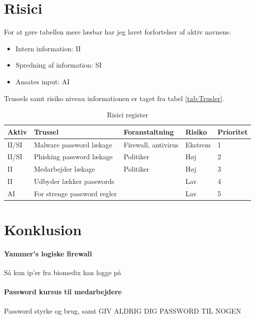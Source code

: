 \documentclass{article}
\begin{document}
\section{Risici}
For at gøre tabellen mere læsbar har jeg lavet forfortelser af aktiv navnene. 
\begin{itemize}
    \item{Intern information:} II
    \item{Spredning af information:} SI
    \item{Ansates input:} AI
\end{itemize}
Trussels samt risiko niveau informationen er taget fra tabel \ref{tab:Trusler}. 

\begin{table}[h!]
    \begin{center}
        \begin{tabularx}{\textwidth}{l|X|X|l|l}
            Aktiv    & Trussel                              & Foranstaltning      & Risiko & Prioritet \\  \hline 
            II/SI    & Malware password lækage              & Firewall, antivirus & Ekstrem& 1\\
            II/SI    & Phishing password lækage             & Politiker           & Høj    & 2\\ 
            II       & Medarbejder lækage                   & Politiker           & Høj    & 3\\
            II       & Udbyder lækker passwords             &                     & Lav    & 4\\
            AI       & For strenge password regler          &                     & Lav    & 5\\
        \end{tabularx}
    \end{center}
    \caption{Risici register}
    \label{tab:riskReg}
\end{table}

\section{Konklusion}

\paragraph{Yammer's logiske firewall}
Så kun ip'er fra biomedix kan logge på

\paragraph{Password kursus til medarbejdere}
Password styrke og brug, samt GIV ALDRIG DIG PASSWORD TIL NOGEN
\end{document}
